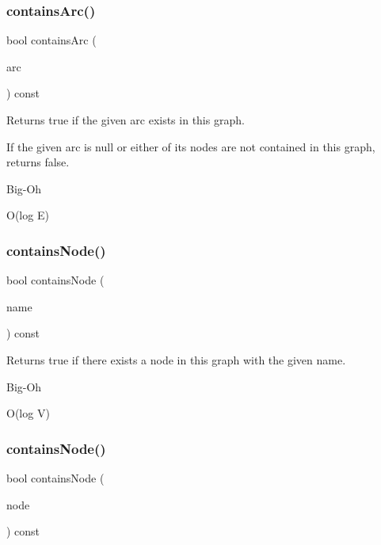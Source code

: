 \subsubsection{\texorpdfstring{contains\+Arc()}{containsArc()}\hspace{0.1cm}{\footnotesize\ttfamily [3/3]}}
{\footnotesize\ttfamily bool contains\+Arc (\begin{DoxyParamCaption}\item[{Arc\+Type $\ast$}]{arc }\end{DoxyParamCaption}) const}



Returns true if the given arc exists in this graph. 

If the given arc is null or either of its nodes are not contained in this graph, returns false. \begin{DoxyRefDesc}{Big-\/\+Oh}
\item[\mbox{\hyperlink{BigOh__BigOh000055}{Big-\/\+Oh}}]O(log E) \end{DoxyRefDesc}
\mbox{\label{classGraph_ac0beb77e8a238c2898ab851df71eeefe}} 
\subsubsection{\texorpdfstring{contains\+Node()}{containsNode()}\hspace{0.1cm}{\footnotesize\ttfamily [1/2]}}
{\footnotesize\ttfamily bool contains\+Node (\begin{DoxyParamCaption}\item[{const std\+::string \&}]{name }\end{DoxyParamCaption}) const}



Returns true if there exists a node in this graph with the given name. 

\begin{DoxyRefDesc}{Big-\/\+Oh}
\item[\mbox{\hyperlink{BigOh__BigOh000056}{Big-\/\+Oh}}]O(log V) \end{DoxyRefDesc}
\mbox{\label{classGraph_a4f540ebc07c4e46a0bb7fee76a93386c}} 
\subsubsection{\texorpdfstring{contains\+Node()}{containsNode()}\hspace{0.1cm}{\footnotesize\ttfamily [2/2]}}
{\footnotesize\ttfamily bool contains\+Node (\begin{DoxyParamCaption}\item[{Node\+Type $\ast$}]{node }\end{DoxyParamCaption}) const}



